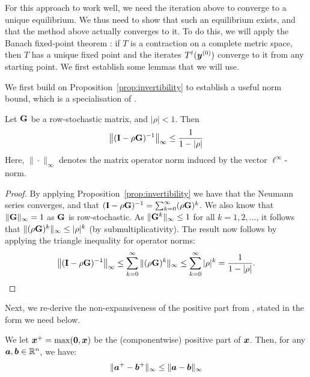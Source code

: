 For this approach to work well, we need the iteration above to converge to a unique equilibrium. We thus need to show that such an equilibrium exists, and that the method above actually converges to it. To do this, we will apply the Banach fixed-point theorem \parencite[Thm.~1.1, p.~10]{GranasDugundji2003}: if $T$ is a contraction on a complete metric space, then $T$ has a unique fixed point and the iterates $T^t(\bm{y}^{(0)})$ converge to it from any starting point. We first establish some lemmas that we will use.

We first build on Proposition~\ref{prop:invertibility} to establish a useful norm bound, which is a specialisation of \textcite[Lemma~2.3.3, p.~74]{GolubVanLoan2013}.

\begin{lemma}
\label{lem:neumann_norm_bound}
Let $\mathbf{G}$ be a row-stochastic matrix, and $|\rho| < 1$. Then
\begin{equation}
\label{eq:neumann_norm_bound}
    \bigl\|(\mathbf{I} - \rho\mathbf{G})^{-1}\bigr\|_\infty \leq \frac{1}{1 - |\rho|}
\end{equation}
Here, $\|\cdot\|_\infty$ denotes the matrix operator norm induced by the vector $\ell^\infty$-norm.
\end{lemma}

\begin{proof}
By applying Proposition~\ref{prop:invertibility} we have that the Neumann series converges, and that $(\mathbf{I} - \rho\mathbf{G})^{-1} = \sum_{k=0}^{\infty}(\rho\mathbf{G})^k$. We also know that $\|\mathbf{G}\|_\infty = 1$ as $\mathbf{G}$ is row-stochastic. As $\|\mathbf{G}^k\|_\infty \leq 1$ for all $k = 1, 2, \ldots$, it follows that $\|(\rho\mathbf{G})^k\|_\infty \leq |\rho|^k$ (by submultiplicativity). The result now follows by applying the triangle inequality for operator norms:
\begin{equation*}
    \bigl\|(\mathbf{I} - \rho\mathbf{G})^{-1}\bigr\|_\infty
    \leq \sum_{k=0}^{\infty} \|(\rho\mathbf{G})^k\|_\infty
    \leq \sum_{k=0}^{\infty} |\rho|^k
    = \frac{1}{1 - |\rho|}. \qedhere
\end{equation*}
\end{proof}

Next, we re-derive the non-expansiveness of the positive part from \parencite[Proposition~4.16, p.~74]{BauschkeCombettes2017}, stated in the form we need below.

\begin{lemma}
\label{lem:lipschitz_max}
We let $\bm{x}^+ = \max(\bm{0}, \bm{x})$ be the (componentwise) positive part of $\bm{x}$. Then, for any $\bm{a}, \bm{b} \in \mathbb{R}^n$, we have:
\begin{equation}
    \|\bm{a}^+ - \bm{b}^+\|_\infty \leq \|\bm{a} - \bm{b}\|_\infty
\end{equation}
\end{lemma}

